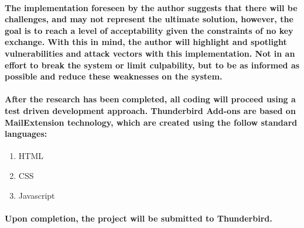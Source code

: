 \documentclass[12pt,a4paper]{article}
\begin{document}
\paragraph{The implementation foreseen by the author suggests that there will be challenges, and may not represent the ultimate solution, however, the goal is to reach a level of acceptability given the constraints of no key exchange. With this in mind, the author will highlight and spotlight vulnerabilities and attack vectors with this implementation. Not in an effort to break the system or limit culpability, but to be as informed as possible and reduce these weaknesses on the system.}

\paragraph{After the research has been completed, all coding will proceed using a test driven development approach. Thunderbird Add-ons are based on MailExtension technology, which are created using the follow standard languages:}

\begin{enumerate}
\item HTML
\item CSS
\item Javascript
\end{enumerate}

\paragraph{Upon completion, the project will be submitted to Thunderbird.}


%
%
%  
%  
%
\end{document}

